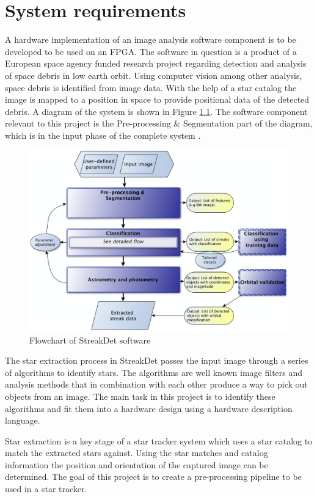\documentclass[12pt]{report}
\begin{document}
\chapter{System requirements}

A hardware implementation of an image analysis software component is to be developed to be used on an FPGA. The software in question is a product of a European space agency funded research project regarding detection and analysis of space debris in low earth orbit. Using computer vision among other analysis, space debris is identified from image data. With the help of a star catalog the image is mapped to a position in space to provide positional data of the detected debris. A diagram of the system is shown in Figure \ref{fig:0}. The software component relevant to this project is the Pre-processing \& Segmentation part of the diagram, which is in the input phase of the complete system \citep{StreakDet} \citep{Starmatch}.

\begin{figure}[h]
    \centering
    \includegraphics[scale=0.2]{figures/streakdet.png}
    \caption{Flowchart of StreakDet software \citep{StreakDet}}
    \label{fig:0}
\end{figure}

The star extraction process in StreakDet passes the input image through a series of algorithms to identify stars. The algorithms are well known image filters and analysis methods that in combination with each other produce a way to pick out objects from an image. The main task in this project is to identify these algorithms and fit them into a hardware design using a hardware description language.
\par
Star extraction is a key stage of a star tracker system which uses a star catalog to match the extracted stars against. Using the star matches and catalog information the position and orientation of the captured image can be determined. The goal of this project is to create a pre-processing pipeline to be used in a star tracker.
\end{document}
